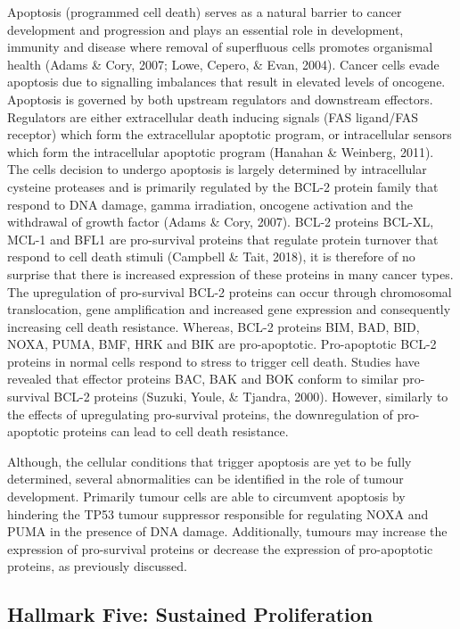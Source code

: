 \documentclass[a4paper, twoside]{templates/ociamthesis}
\begin{document}
Apoptosis (programmed cell death) serves as a natural barrier to cancer development and progression and plays an essential role in development, immunity and disease where removal of superfluous cells promotes organismal health (Adams \& Cory, 2007; Lowe, Cepero, \& Evan, 2004). Cancer cells evade apoptosis due to signalling imbalances that result in elevated levels of oncogene. Apoptosis is governed by both upstream regulators and downstream effectors. Regulators are either extracellular death inducing signals (FAS ligand/FAS receptor) which form the extracellular apoptotic program, or intracellular sensors which form the intracellular apoptotic program (Hanahan \& Weinberg, 2011). The cells decision to undergo apoptosis is largely determined by intracellular cysteine proteases and is primarily regulated by the BCL-2 protein family that respond to DNA damage, gamma irradiation, oncogene activation and the withdrawal of growth factor (Adams \& Cory, 2007). BCL-2 proteins BCL-XL, MCL-1 and BFL1 are pro-survival proteins that regulate protein turnover that respond to cell death stimuli (Campbell \& Tait, 2018), it is therefore of no surprise that there is increased expression of these proteins in many cancer types. The upregulation of pro-survival BCL-2 proteins can occur through chromosomal translocation, gene amplification and increased gene expression and consequently increasing cell death resistance. Whereas, BCL-2 proteins BIM, BAD, BID, NOXA, PUMA, BMF, HRK and BIK are pro-apoptotic. Pro-apoptotic BCL-2 proteins in normal cells respond to stress to trigger cell death. Studies have revealed that effector proteins BAC, BAK and BOK conform to similar pro-survival BCL-2 proteins (Suzuki, Youle, \& Tjandra, 2000). However, similarly to the effects of upregulating pro-survival proteins, the downregulation of pro-apoptotic proteins can lead to cell death resistance.

Although, the cellular conditions that trigger apoptosis are yet to be fully determined, several abnormalities can be identified in the role of tumour development. Primarily tumour cells are able to circumvent apoptosis by hindering the TP53 tumour suppressor responsible for regulating NOXA and PUMA in the presence of DNA damage. Additionally, tumours may increase the expression of pro-survival proteins or decrease the expression of pro-apoptotic proteins, as previously discussed.

\hypertarget{hallmark-five-sustained-proliferation}{%
\subsection{Hallmark Five: Sustained Proliferation}\label{hallmark-five-sustained-proliferation}}
\end{document}
